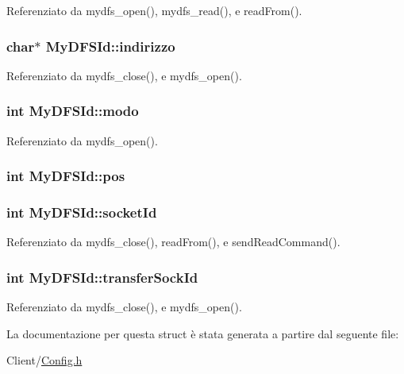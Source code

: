 Referenziato da mydfs\+\_\+open(), mydfs\+\_\+read(), e read\+From().

\hypertarget{structMyDFSId_ac8c10a1a5b18776bf5e5585ee9e26331}{
\subsubsection[{indirizzo}]{\setlength{\rightskip}{0pt plus 5cm}char$\ast$ My\+D\+F\+S\+Id\+::indirizzo}}\label{structMyDFSId_ac8c10a1a5b18776bf5e5585ee9e26331}


Referenziato da mydfs\+\_\+close(), e mydfs\+\_\+open().

\hypertarget{structMyDFSId_a98bc5ce1a7734459d8b81c997da4e9f0}{
\subsubsection[{modo}]{\setlength{\rightskip}{0pt plus 5cm}int My\+D\+F\+S\+Id\+::modo}}\label{structMyDFSId_a98bc5ce1a7734459d8b81c997da4e9f0}


Referenziato da mydfs\+\_\+open().

\hypertarget{structMyDFSId_aaeac229fb85c313f91a76f00be916832}{
\subsubsection[{pos}]{\setlength{\rightskip}{0pt plus 5cm}int My\+D\+F\+S\+Id\+::pos}}\label{structMyDFSId_aaeac229fb85c313f91a76f00be916832}
\hypertarget{structMyDFSId_a382a74f109962751085cea7aac2892cc}{
\subsubsection[{socket\+Id}]{\setlength{\rightskip}{0pt plus 5cm}int My\+D\+F\+S\+Id\+::socket\+Id}}\label{structMyDFSId_a382a74f109962751085cea7aac2892cc}


Referenziato da mydfs\+\_\+close(), read\+From(), e send\+Read\+Command().

\hypertarget{structMyDFSId_a3b62a6d0f52a871bda4bf9cd56c57ff7}{
\subsubsection[{transfer\+Sock\+Id}]{\setlength{\rightskip}{0pt plus 5cm}int My\+D\+F\+S\+Id\+::transfer\+Sock\+Id}}\label{structMyDFSId_a3b62a6d0f52a871bda4bf9cd56c57ff7}


Referenziato da mydfs\+\_\+close(), e mydfs\+\_\+open().



La documentazione per questa struct è stata generata a partire dal seguente file\+:\begin{DoxyCompactItemize}
\item 
Client/\hyperlink{Client_2Config_8h}{Config.\+h}\end{DoxyCompactItemize}
